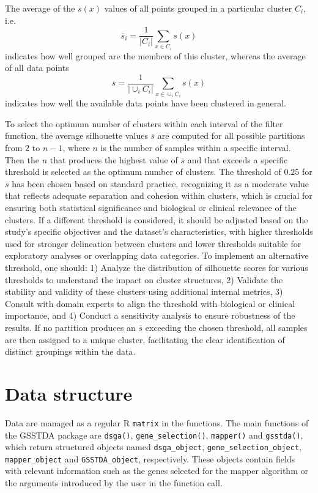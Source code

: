 The average of the \(s(x)\) values of all points grouped in a particular cluster \(C_{i},\) i.e.
\[
\overline{s}_i = \frac{1}{|C_i|}\sum_{x \in C_i}s(x)
\]
indicates how well grouped are the members of this cluster, whereas the average
of all data points
\[
\overline{s} = \frac{1}{|\cup_i C_i|}\sum_{x \in \cup_i C_i}s(x)
\]
indicates how well the available data points have been clustered in general.

To select the optimum number of clusters within each interval of the filter function, the average silhouette values \(\overline{s}\) are computed for all possible partitions from \(2\) to \(n-1\), where \(n\) is the number of samples within a specific interval. Then the \(n\) that produces the highest value of \(\overline{s}\) and that exceeds a specific threshold is selected as the optimum number of clusters. The threshold of \(0.25\) for \(\overline{s}\) has been chosen based on standard practice, recognizing it as a moderate value that reflects adequate separation and cohesion within clusters, which is crucial for ensuring both statistical significance and biological or clinical relevance of the clusters. If a different threshold is considered, it should be adjusted based on the study's specific objectives and the dataset's characteristics, with higher thresholds used for stronger delineation between clusters and lower thresholds suitable for exploratory analyses or overlapping data categories. To implement an alternative threshold, one should: 1) Analyze the distribution of silhouette scores for various thresholds to understand the impact on cluster structures, 2) Validate the stability and validity of these clusters using additional internal metrics, 3) Consult with domain experts to align the threshold with biological or clinical importance, and 4) Conduct a sensitivity analysis to ensure robustness of the results. If no partition produces an \(\overline{s}\) exceeding the chosen threshold, all samples are then assigned to a unique cluster, facilitating the clear identification of distinct groupings within the data.

\hypertarget{section3}{%
\section{Data structure}\label{section3}}

Data are managed as a regular R \texttt{matrix} in the  functions. The main functions of the GSSTDA package are \texttt{dsga()}, \texttt{gene\_selection()}, \texttt{mapper()} and \texttt{gsstda()}, which return structured objects named \texttt{dsga\_object}, \texttt{gene\_selection\_object}, \texttt{mapper\_object} and \texttt{GSSTDA\_object}, respectively. These objects contain fields with relevant information such as the genes selected for the mapper algorithm or the arguments introduced by the user in the function call.

